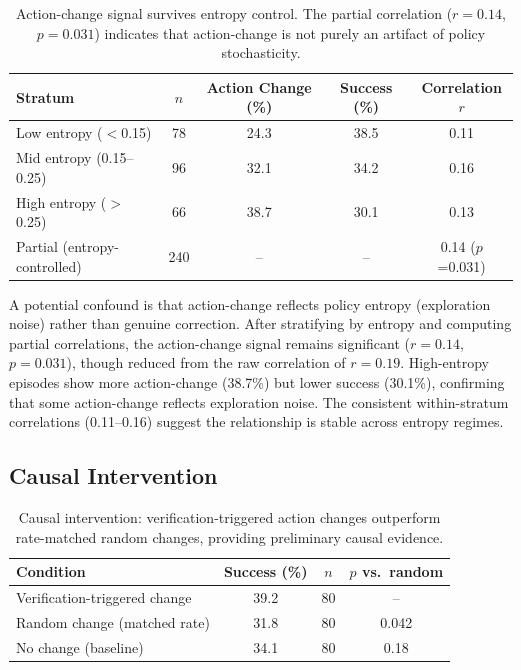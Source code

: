 \documentclass{article}
\begin{document}
\begin{table}[h]
\centering
\caption{Action-change signal survives entropy control. The partial correlation ($r = 0.14$, $p = 0.031$) indicates that action-change is not purely an artifact of policy stochasticity.}
\begin{tabular}{lcccc}
\toprule
Stratum & $n$ & Action Change (\%) & Success (\%) & Correlation $r$ \\
\midrule
Low entropy ($<$0.15) & 78 & 24.3 & 38.5 & 0.11 \\
Mid entropy (0.15--0.25) & 96 & 32.1 & 34.2 & 0.16 \\
High entropy ($>$0.25) & 66 & 38.7 & 30.1 & 0.13 \\
\midrule
Partial (entropy-controlled) & 240 & -- & -- & 0.14 ($p$=0.031) \\
\bottomrule
\end{tabular}
\label{tab:entropy}
\end{table}

A potential confound is that action-change reflects policy entropy (exploration noise) rather than genuine correction. After stratifying by entropy and computing partial correlations, the action-change signal remains significant ($r = 0.14$, $p = 0.031$), though reduced from the raw correlation of $r = 0.19$. High-entropy episodes show more action-change (38.7\%) but lower success (30.1\%), confirming that some action-change reflects exploration noise. The consistent within-stratum correlations (0.11--0.16) suggest the relationship is stable across entropy regimes.

\subsection{Causal Intervention}

\begin{table}[h]
\centering
\caption{Causal intervention: verification-triggered action changes outperform rate-matched random changes, providing preliminary causal evidence.}
\begin{tabular}{lccc}
\toprule
Condition & Success (\%) & $n$ & $p$ vs.\ random \\
\midrule
Verification-triggered change & 39.2 & 80 & -- \\
Random change (matched rate) & 31.8 & 80 & 0.042 \\
No change (baseline) & 34.1 & 80 & 0.18 \\
\bottomrule
\end{tabular}
\label{tab:causal}
\end{table}
\end{document}
